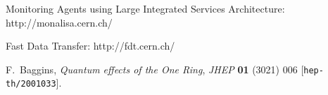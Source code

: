 

\begin{thebibliography}{1}

Monitoring Agents using Large Integrated Services Architecture: http://monalisa.cern.ch/

Fast Data Transfer: http://fdt.cern.ch/

F.~Baggins, \emph{Quantum effects of the One Ring},
\emph{JHEP} {\bf 01} (3021) 006 [{\tt hep-th/2001033}].

\end{thebibliography}
